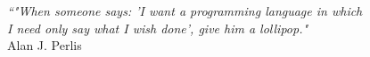 \cleardoublepage
\thispagestyle{plain}

\vspace*{8cm}

\begin{flushright}
   \textsl{``"When someone says: 
   'I want a programming language
   in which\\ I need only say what I wish done',
   give him a lollipop."} \\
\vspace*{1.5cm}
           Alan J. Perlis
\end{flushright}